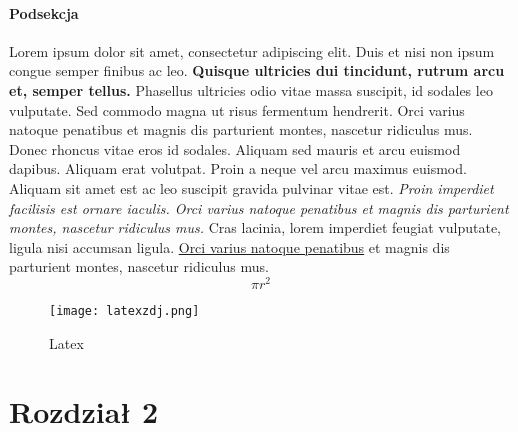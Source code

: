 \documentclass[12pt,a4paper]{article}
\begin{document}
	\subsection{Podsekcja}
	\label{Podsekcja}
	Lorem ipsum dolor sit amet, consectetur adipiscing elit. Duis et nisi non ipsum congue semper finibus ac leo. \textbf{Quisque ultricies dui tincidunt, rutrum arcu et, semper tellus.} Phasellus ultricies odio vitae massa suscipit, id sodales leo vulputate. Sed commodo magna ut risus fermentum hendrerit. Orci varius natoque penatibus et magnis dis parturient montes, nascetur ridiculus mus. Donec rhoncus vitae eros id sodales. Aliquam sed mauris et arcu euismod dapibus. Aliquam erat volutpat. Proin a neque vel arcu maximus euismod. Aliquam sit amet est ac leo suscipit gravida pulvinar vitae est. \textit{Proin imperdiet facilisis est ornare iaculis. Orci varius natoque penatibus et magnis dis parturient montes, nascetur ridiculus mus.} Cras lacinia, lorem imperdiet feugiat vulputate, ligula nisi accumsan ligula.  \underline{Orci varius natoque penatibus} et magnis dis parturient montes, nascetur ridiculus mus.
 $$
        \pi r^2
    $$
	\begin{figure}[H]
		\centering
		\texttt{[image: latexzdj.png]}
		\caption{Latex}
		\label{fig: Latex}
	\end{figure}
	
	\part{Rozdział 2}
\end{document}
